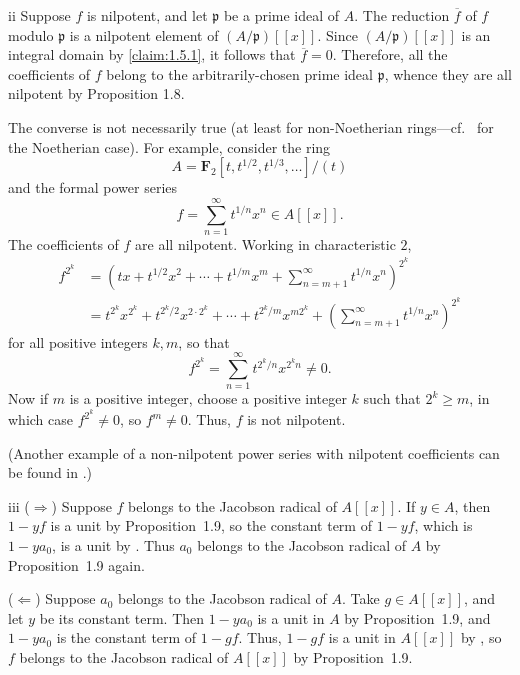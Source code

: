 \begin{partsolution}{1}{5}{ii}
Suppose \(f\) is nilpotent, and let \(\mathfrak p\) be a prime ideal of \(A\).
The reduction \(\overline f\) of \(f\) modulo \(\mathfrak p\) is a nilpotent element of \((A/\mathfrak p)[[x]]\).
Since \((A/\mathfrak p)[[x]]\) is an integral domain by \autoref{claim:1.5.1}, it follows that \(\overline f = 0\).
Therefore, all the coefficients of \(f\) belong to the arbitrarily-chosen prime ideal \(\mathfrak p\), whence they are all nilpotent by Proposition 1.8.

The converse is not necessarily true (at least for non-Noetherian rings---cf.~ for the Noetherian case).
For example, consider the ring
\begin{equation*}
A = \mathbf{F}_2[t, t^{1/2}, t^{1/3}, \ldots]/(t)
\end{equation*}
and the formal power series
\begin{equation*}
f = \sum_{n=1}^\infty t^{1/n} x^n \in A[[x]].
\end{equation*}
The coefficients of \(f\) are all nilpotent.
Working in characteristic \(2\),
\begin{align*}
f^{2^k}
&= \left(t x + t^{1/2} x^2 + \cdots + t^{1/m} x^m + \sum_{n = m + 1}^\infty t^{1/n} x^n\right)^{2^k}
\\&= t^{2^k} x^{2^k} + t^{2^k / 2} x^{2\cdot2^k} + \cdots + t^{2^k / m} x^{m 2^k} + \left(\sum_{n = m+1}^\infty t^{1/n} x^n\right)^{2^k}
\end{align*}
for all positive integers \(k, m\), so that
\begin{equation*}
f^{2^k}
= \sum_{n=1}^\infty t^{2^k/n} x^{2^k n} \neq 0.
\end{equation*}
Now if \(m\) is a positive integer, choose a positive integer \(k\) such that \(2^k \geq m\), in which case \(f^{2^k} \neq 0\), so \(f^m \neq 0\).
Thus, \(f\) is not nilpotent.

(Another example of a non-nilpotent power series with nilpotent coefficients can be found in \cite[Example 2]{FieldsZeroDivisors}.)
\end{partsolution}

\begin{partsolution}{1}{5}{iii}
(\(\Rightarrow\))
Suppose \(f\) belongs to the Jacobson radical of \(A[[x]]\).
If \(y \in A\), then \(1 - y f\) is a unit by Proposition~1.9, so the constant term of \(1 - y f\), which is \(1 - y a_0\), is a unit by .
Thus \(a_0\) belongs to the Jacobson radical of \(A\) by Proposition~1.9 again.

(\(\Leftarrow\))
Suppose \(a_0\) belongs to the Jacobson radical of \(A\).
Take \(g \in A[[x]]\), and let \(y\) be its constant term.
Then \(1 - y a_0\) is a unit in \(A\) by Proposition~1.9, and \(1 - y a_0\) is the constant term of \(1 - g f\).
Thus, \(1 - g f\) is a unit in \(A[[x]]\) by , so \(f\) belongs to the Jacobson radical of \(A[[x]]\) by Proposition~1.9.
\end{partsolution}

